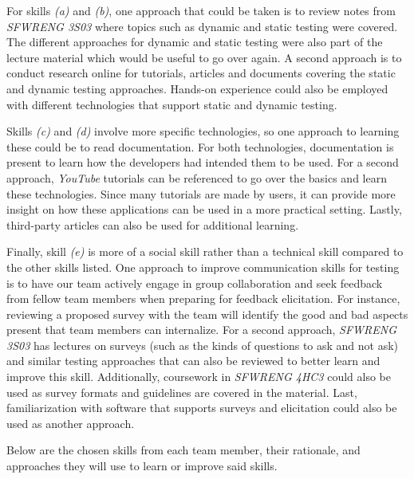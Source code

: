 \documentclass[12pt, titlepage]{article}
\begin{document}
\begin{enumerate}
  For skills \textit{(a)} and \textit{(b)}, one approach that could be taken is to review notes from
  \textit{SFWRENG 3S03} where topics such as dynamic and static testing were covered. The different
  approaches for dynamic and static testing were also part of the lecture material which would be useful to go over again.
  A second approach is to conduct research online for tutorials, articles and documents covering the static and dynamic testing
  approaches. Hands-on experience could also be employed with different technologies that
  support static and dynamic testing.\par

  Skills \textit{(c)} and \textit{(d)} involve more specific technologies, so one approach to learning these
  could be to read documentation. For both technologies, documentation is present to learn how the
  developers had intended them to be used. For a second approach, \textit{YouTube} tutorials can be referenced to
  go over the basics and learn these technologies. Since many tutorials are made by users, it
  can provide more insight on how these applications can be used in a more practical setting.
  Lastly, third-party articles can also be used for additional learning. \par

  Finally, skill \textit{(e)} is more of a social skill rather than a technical skill compared to the other skills listed.
  One approach to improve communication skills for testing is to have our team actively engage in group collaboration and seek feedback from fellow team members when preparing for feedback elicitation. For instance, reviewing a proposed survey with the team will identify the good and bad aspects present that team members can internalize. For a second approach, \textit{SFWRENG 3S03} has lectures on surveys
  (such as the kinds of questions to ask and not ask) and similar testing approaches that can also be reviewed to better
  learn and improve this skill. Additionally, coursework in \textit{SFWRENG 4HC3} could also be used as survey formats and guidelines
  are covered in the material. Last, familiarization with software that supports surveys and elicitation could also be used as
  another approach.

  Below are the chosen skills from each team member, their rationale, and approaches they will use to learn or
  improve said skills.


\end{enumerate}
\end{document}
